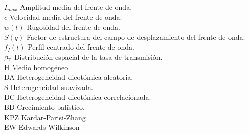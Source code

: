 \documentclass[12pt,screen,twoside]{ibtesis}
\begin{document}
\begin{preliminary}
\begin{abreviaturas}
{  $I_{max}$ \hspace*{.3cm} Amplitud media del frente de onda.\\
  $c$ \hspace*{.3cm} Velocidad media del frente de onda.\\
  $w(t)$ \hspace*{.3cm} Rugosidad del frente de onda.\\
  $S(q)$ \hspace*{.3cm} Factor de estructura del campo de desplazamiento del frente de onda.\\
  $f_I(t)$ \hspace*{.3cm} Perfil centrado del frente de onda.\\
  $\beta_{\vb r}$ \hspace*{.3cm} Distribución espacial de la tasa de transmisión.\\
  H \hspace*{.3cm} Medio homogéneo\\
  DA \hspace*{.3cm} Heterogeneidad dicotómica-aleatoria.\\
  S \hspace*{.3cm} Heterogeneidad suavizada.\\
  DC \hspace*{.3cm} Heterogeneidad dicotómica-correlacionada.\\
  BD \hspace*{.3cm} Crecimiento balístico.\\
  KPZ \hspace*{.3cm} Kardar-Parisi-Zhang\\
  EW \hspace*{.3cm} Edwards-Wilkinson\\
  }
\end{abreviaturas}

\listoffigures
\listoftables



\end{preliminary}











%

\begin{biblio}

\end{biblio}
\end{document}
